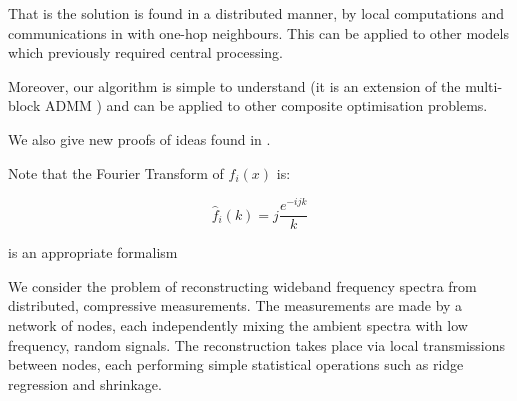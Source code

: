 That is the solution is found in a distributed manner, by local computations and communications in with one-hop neighbours. This can be applied to other models which previously required central processing.

Moreover, our algorithm is simple to understand (it is an extension of the multi-block ADMM \cite{mota2013d}) and can be applied to other composite optimisation problems.

We also give new proofs of ideas found in \cite{mota2013d}. 


Note that the Fourier Transform of \(f_i\left(x\right)\) is:

\begin{equation}
\hat{f}_i\left(k\right) = j\frac{e^{-ijk}}{k}
\end{equation}

is an appropriate formalism


 We consider the problem of reconstructing wideband frequency spectra from distributed, compressive measurements. The measurements are made by a network of nodes, each independently mixing the ambient spectra with low frequency, random signals. The reconstruction takes place via local transmissions between nodes, each performing simple statistical operations such as ridge regression and shrinkage.